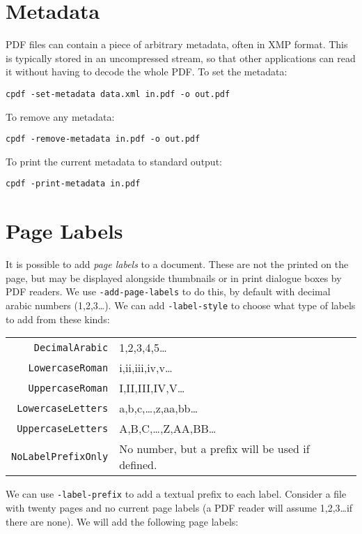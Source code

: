 \documentclass{book}
\begin{document}
  \section{Metadata}
  PDF files can contain a piece of arbitrary metadata, often in XMP format.
This is typically stored in an uncompressed stream, so that other applications
can read it without having to decode the whole PDF. To set the metadata:
  \begin{framed}
    \small\verb!cpdf -set-metadata data.xml in.pdf -o out.pdf!
  \end{framed}
  \noindent To remove any metadata:
  \begin{framed}
    \small\verb!cpdf -remove-metadata in.pdf -o out.pdf!
  \end{framed}
  \noindent To print the current metadata to standard output:
  \begin{framed}
    \small\verb!cpdf -print-metadata in.pdf!
  \end{framed}

\section{Page Labels}

It is possible to add \textit{page labels} to a document. These are not the printed on the page, but may be displayed alongside thumbnails or in print dialogue boxes by PDF readers. We use \texttt{-add-page-labels} to do this, by default with decimal arabic numbers (1,2,3\ldots). We can add \texttt{-label-style} to choose what type of labels to add from these kinds:

\vspace{4mm}
{\small\begin{tabular}{rl}
  \texttt{DecimalArabic} & 1,2,3,4,5\ldots \\
  \texttt{LowercaseRoman} & i,ii,iii,iv,v\ldots \\
  \texttt{UppercaseRoman} & I,II,III,IV,V\ldots \\
  \texttt{LowercaseLetters} & a,b,c,\ldots,z,aa,bb\ldots \\
  \texttt{UppercaseLetters} & A,B,C,\ldots,Z,AA,BB\ldots \\
  \texttt{NoLabelPrefixOnly} & No number, but a prefix will be used if defined.
\end{tabular}}
\vspace{4mm}

\noindent We can use \texttt{-label-prefix} to add a textual prefix to each label. 
Consider a file with twenty pages and no current page labels (a PDF reader will assume 1,2,3\ldots if there are none). We will add the following page labels:
\end{document}
